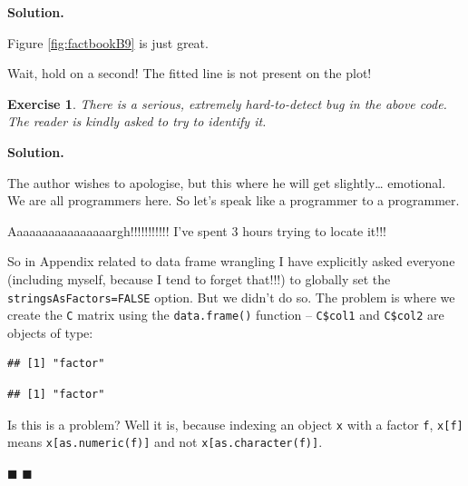 \documentclass[10pt,b5paper,krantz1]{krantz}
\newenvironment{Shaded}{\begin{snugshade}}{\end{snugshade}}
\newcommand{\KeywordTok}[1]{\textcolor[rgb]{0.27,0.27,0.27}{\textbf{#1}}}
\newcommand{\NormalTok}[1]{#1}
\newcommand{\OperatorTok}[1]{\textcolor[rgb]{0.43,0.43,0.43}{\textbf{#1}}}
\newtheorem{exercise}{Exercise}[chapter]
\newenvironment{solution}{%
\bigskip\noindent\textbf{Solution. }%
\it\ignorespaces%
\ignorespaces%
}{\ignorespaces%
\hfill$\blacksquare$%
}
\begin{document}
\begin{solution}
Figure \ref{fig:factbookB9} is just great.

Wait, hold on a second! The fitted line is not present on the plot!

\begin{exercise}

There is a serious, extremely hard-to-detect bug in the above code.
The reader is kindly asked to try to identify it.

\end{exercise}

\begin{solution}

The author wishes to apologise, but this where he will get slightly\ldots{}
emotional. We are all programmers here. So let's speak like a programmer
to a programmer.

Aaaaaaaaaaaaaaaargh!!!!!!!!!!!
I've spent 3 hours trying to locate it!!!

So in Appendix related to data frame wrangling I have
explicitly asked everyone (including myself, because I tend to
forget that!!!)
to globally set the \texttt{stringsAsFactors=FALSE} option.
But we didn't do so.
The problem is where we create the \texttt{C} matrix using the \texttt{data.frame()}
function -- \texttt{C\$col1} and \texttt{C\$col2} are objects of type:

\begin{Shaded}
\end{Shaded}

\begin{verbatim}
## [1] "factor"
\end{verbatim}

\begin{Shaded}
\end{Shaded}

\begin{verbatim}
## [1] "factor"
\end{verbatim}

Is this is a problem? Well it is, because
indexing an object \texttt{x} with a factor \texttt{f},
\texttt{x{[}f{]}} means \texttt{x{[}as.numeric(f){]}} and not \texttt{x{[}as.character(f){]}}.


\end{solution}
\end{solution}
\end{document}
